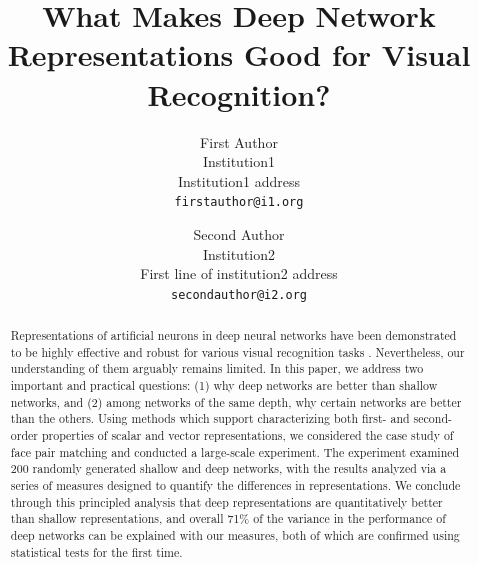 \documentclass[10pt,twocolumn,letterpaper]{article}
\begin{document}
\title{What Makes Deep Network Representations Good for Visual Recognition?}

\author{First Author\\
Institution1\\
Institution1 address\\
{\tt\small firstauthor@i1.org}
\and
Second Author\\
Institution2\\
First line of institution2 address\\
{\tt\small secondauthor@i2.org}
}

\maketitle

\begin{abstract}

Representations of artificial neurons in deep neural networks have been demonstrated to be highly effective and robust for various visual recognition tasks \cite{krizhevsky2012imagenet, sermanet2013overfeat, donahue2014decaf}.
Nevertheless, our understanding of them arguably remains limited.
In this paper, we address two important and practical questions: (1) why deep networks are better than shallow networks, and (2) among networks of the same depth, why certain networks are better than the others.
Using methods which support characterizing both first- and second-order properties of scalar and vector representations, we considered the case study of face pair matching and conducted a large-scale experiment.
The experiment examined 200 randomly generated shallow and deep networks, with the results analyzed via a series of measures designed to quantify the differences in representations. 
We conclude through this principled analysis that deep representations are quantitatively better than shallow representations, and overall 71\% of the variance in the performance of deep networks can be explained with our measures, both of which are confirmed using statistical tests for the first time.

\end{abstract}
\end{document}
